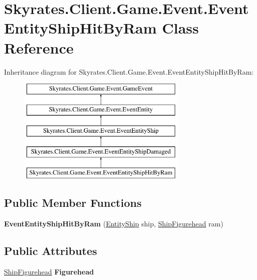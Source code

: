 \hypertarget{class_skyrates_1_1_client_1_1_game_1_1_event_1_1_event_entity_ship_hit_by_ram}{\section{Skyrates.\-Client.\-Game.\-Event.\-Event\-Entity\-Ship\-Hit\-By\-Ram Class Reference}
\label{class_skyrates_1_1_client_1_1_game_1_1_event_1_1_event_entity_ship_hit_by_ram}
}
Inheritance diagram for Skyrates.\-Client.\-Game.\-Event.\-Event\-Entity\-Ship\-Hit\-By\-Ram\-:\begin{figure}[H]
\begin{center}
\leavevmode
\includegraphics[height=5.000000cm]{class_skyrates_1_1_client_1_1_game_1_1_event_1_1_event_entity_ship_hit_by_ram}
\end{center}
\end{figure}
\subsection*{Public Member Functions}
\begin{DoxyCompactItemize}
\item 
\hypertarget{class_skyrates_1_1_client_1_1_game_1_1_event_1_1_event_entity_ship_hit_by_ram_ad94fc2f7f3edfe005e00b18b7f8ade24}{{\bfseries Event\-Entity\-Ship\-Hit\-By\-Ram} (\hyperlink{class_skyrates_1_1_common_1_1_entity_1_1_entity_ship}{Entity\-Ship} ship, \hyperlink{class_skyrates_1_1_client_1_1_ship_1_1_ship_figurehead}{Ship\-Figurehead} ram)}\label{class_skyrates_1_1_client_1_1_game_1_1_event_1_1_event_entity_ship_hit_by_ram_ad94fc2f7f3edfe005e00b18b7f8ade24}

\end{DoxyCompactItemize}
\subsection*{Public Attributes}
\begin{DoxyCompactItemize}
\item 
\hypertarget{class_skyrates_1_1_client_1_1_game_1_1_event_1_1_event_entity_ship_hit_by_ram_a139003403af668e386ef09085511a81c}{\hyperlink{class_skyrates_1_1_client_1_1_ship_1_1_ship_figurehead}{Ship\-Figurehead} {\bfseries Figurehead}}\label{class_skyrates_1_1_client_1_1_game_1_1_event_1_1_event_entity_ship_hit_by_ram_a139003403af668e386ef09085511a81c}

\end{DoxyCompactItemize}
